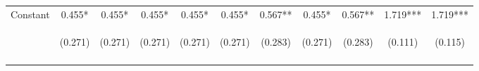 \begin{center}
\begin{tabular}{lcccccccccc}
Constant & 0.455* & 0.455* & 0.455* & 0.455* & 0.455* & 0.567** & 0.455* & 0.567** & 1.719*** & 1.719*** \\
 & \begin{footnotesize}(0.271)\end{footnotesize} & \begin{footnotesize}(0.271)\end{footnotesize} & \begin{footnotesize}(0.271)\end{footnotesize} & \begin{footnotesize}(0.271)\end{footnotesize} & \begin{footnotesize}(0.271)\end{footnotesize} & \begin{footnotesize}(0.283)\end{footnotesize} & \begin{footnotesize}(0.271)\end{footnotesize} & \begin{footnotesize}(0.283)\end{footnotesize} & \begin{footnotesize}(0.111)\end{footnotesize} & \begin{footnotesize}(0.115)\end{footnotesize} \\
\vspace{4pt} & \begin{footnotesize}\end{footnotesize} & \begin{footnotesize}\end{footnotesize} & \begin{footnotesize}\end{footnotesize} & \begin{footnotesize}\end{footnotesize} & \begin{footnotesize}\end{footnotesize} & \begin{footnotesize}\end{footnotesize} & \begin{footnotesize}\end{footnotesize} & \begin{footnotesize}\end{footnotesize} & \begin{footnotesize}\end{footnotesize} & \begin{footnotesize}\end{footnotesize} \\

\end{tabular}
\end{center}
